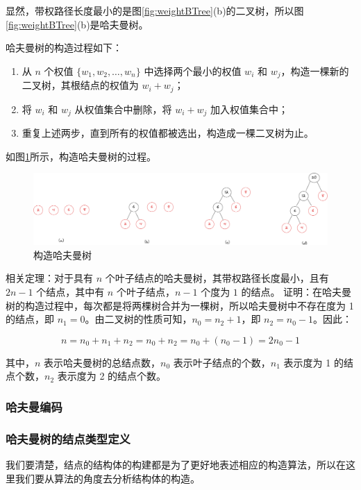 \documentclass[lang=cn,newtx,10pt,scheme=chinese]{elegantbook}
\begin{document}
显然，带权路径长度最小的是图\ref{fig:weightBTree}(b)的二叉树，所以图\ref{fig:weightBTree}(b)是哈夫曼树。

哈夫曼树的构造过程如下：

\begin{enumerate}
  \item 从 $n$ 个权值 $\{w_1, w_2, \dots, w_n\}$ 中选择两个最小的权值 $w_i$ 和 $w_j$，构造一棵新的二叉树，其根结点的权值为 $w_i + w_j$；
  \item 将 $w_i$ 和 $w_j$ 从权值集合中删除，将 $w_i + w_j$ 加入权值集合中；
  \item 重复上述两步，直到所有的权值都被选出，构造成一棵二叉树为止。
  \end{enumerate}

如图\ref{fig:HuffmanTree}所示，构造哈夫曼树的过程。

\begin{figure}[h!]
  \centering
  \includegraphics[width=1\textwidth]{./figure/pdf/cropped/createHaffman.pdf}
  \caption{构造哈夫曼树}
  \label{fig:HuffmanTree}
\end{figure}

相关定理：对于具有 $n$ 个叶子结点的哈夫曼树，其带权路径长度最小，且有 $2n-1$ 个结点，其中有 $n$ 个叶子结点，$n-1$ 个度为 $1$ 的结点。
证明：在哈夫曼树的构造过程中，每次都是将两棵树合并为一棵树，所以哈夫曼树中不存在度为 1 的结点，即 $n_1 = 0$。由二叉树的性质可知，$n_0 = n_2 + 1$，即 $n_2 = n_0 - 1$。因此：

\[
n = n_0 + n_1 + n_2 = n_0 + n_2 = n_0 + (n_0 - 1) = 2n_0 - 1
\]

其中，$n$ 表示哈夫曼树的总结点数，$n_0$ 表示叶子结点的个数，$n_1$ 表示度为 1 的结点个数，$n_2$ 表示度为 2 的结点个数。

\subsubsection{哈夫曼编码}
\subsubsection{哈夫曼树的结点类型定义}

我们要清楚，结点的结构体的构建都是为了更好地表述相应的构造算法，所以在这里我们要从算法的角度去分析结构体的构造。
\end{document}
